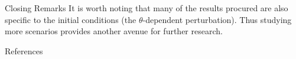 \documentclass[final]{beamer}
\newlength{\onecolwid}
\begin{document}
\begin{frame}[t]
\begin{columns}[t]
\begin{column}{\onecolwid}
\begin{block}{Closing Remarks}
It is worth noting that many of the results procured are also specific to the initial conditions (the $\theta$-dependent perturbation). Thus studying more scenarios provides another avenue for further research.
\end{block}


\begin{block}{References}
\nocite{*} %
\tiny{
\vspace{0.75in}}
\end{block}


\end{column} %

\end{columns} %

\end{frame} %
\end{document}
